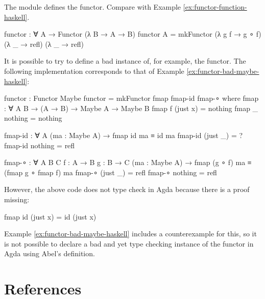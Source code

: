 \begin{example}
  \label{ex:functor-function-agda}

  The module  defines the
   functor. Compare with Example
  \ref{ex:functor-function-haskell}.
  \begin{codeagda}
functor : ∀ {A} → Functor (λ B → A → B)
functor {A} = mkFunctor (λ g f → g ∘ f) (λ _ → refl) (λ _ → refl)
  \end{codeagda}

\end{example}

\begin{example}
  \label{ex:functor-bad-maybe-agda}

  It is possible to try to define a bad instance of, for example,
  the  functor. The following implementation corresponds
  to that of Example \ref{ex:functor-bad-maybe-haskell}:
  \begin{codeagda}
functor : Functor Maybe
functor = mkFunctor fmap fmap-id fmap-∘
  where
    fmap : ∀ {A B} → (A → B) → Maybe A → Maybe B
    fmap f (just x) = nothing
    fmap _ nothing  = nothing

    fmap-id : ∀ {A} (ma : Maybe A) → fmap id ma ≡ id ma
    fmap-id (just _) = ?
    fmap-id nothing  = refl

    fmap-∘ : ∀ {A B C} {f : A → B} {g : B → C}
             (ma : Maybe A) → fmap (g ∘ f) ma ≡ (fmap g ∘ fmap f) ma
    fmap-∘ (just _) = refl
    fmap-∘ nothing  = refl
  \end{codeagda}
  However, the above code does not type check in Agda because there is
  a proof missing:
  \begin{codeagda}
fmap id (just x) = id (just x)
  \end{codeagda}
  Example \ref{ex:functor-bad-maybe-haskell} includes a
  counterexample for this, so it is not possible to declare a bad and
  yet type checking instance of the  functor in Agda
  using Abel's definition.

\end{example}

\section{References}
\label{sec:functors-references}


